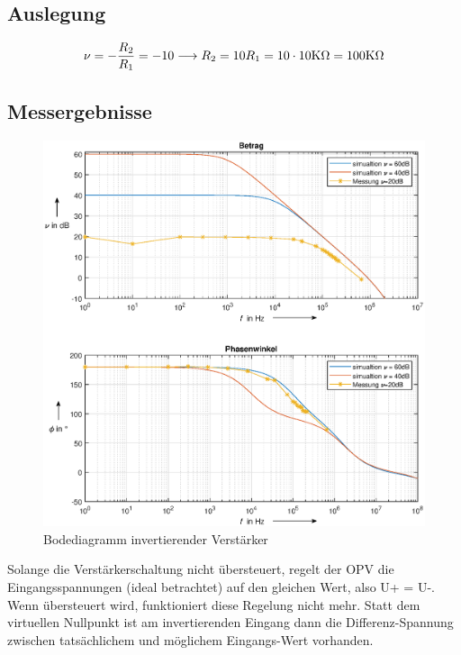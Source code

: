 \subsection{Auslegung}
\begin{align}
    \nu = -\frac{R_2}{R_1} =-10 \longrightarrow R_2 = 10R_1=10\cdot 10\text{K}\Omega =100\text{K}\Omega
\end{align}
\subsection{Messergebnisse}
\begin{figure}[H]
    \centering
    \includegraphics[width=\costumPicWidth]{Lab_1/Plots/inv_verst.eps}
    \caption{Bodediagramm invertierender Verstärker}
    \label{fig:bode_inv_verst}
\end{figure}
Solange die Verstärkerschaltung nicht übersteuert, regelt der OPV die Eingangsspannungen (ideal betrachtet) auf
den gleichen Wert, also U+ = U-. Wenn übersteuert wird, funktioniert diese Regelung nicht mehr. Statt dem
virtuellen Nullpunkt ist am invertierenden Eingang dann die Differenz-Spannung zwischen tatsächlichem und
möglichem Eingangs-Wert vorhanden.
